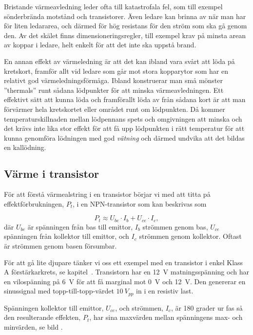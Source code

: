 Bristande värmeavledning leder ofta till katastrofala fel, som till exempel
sönderbrända motstånd och transistorer. Även ledare kan brinna av när man
har för liten ledararea, och därmed för hög resistans för den ström som
ska gå genom den. Av det skälet finns dimensioneringsregler, till exempel
krav på minsta arean av koppar i ledare, helt enkelt för att det inte ska
uppstå brand.

En annan effekt av värmeledning är att det kan ibland vara svårt att löda
på kretskort, framför allt vid ledare som går mot stora kopparytor som
har en relativt god värmeledningsförmåga. Ibland konstruerar man små mönster
''thermals'' runt sådana lödpunkter för att minska värmeavledningen.
Ett effektivt sätt att kunna löda och framförallt löda av från sådana
kort är att man förvärmer hela kretskortet eller området runt om
lödpunkten. Då kommer temperaturskillnaden mellan lödpennans spets och
omgivningen att minska och det krävs inte lika stor effekt för att få
upp lödpunkten i rätt temperatur för att kunna genomföra lödningen med god
\emph{vätning} och därmed undvika att det bildas en kallödning.

\subsection{Värme i transistor}


För att förstå värmealstring i en transistor börjar vi med att titta
på effektförbrukningen, \(P_t\), i en NPN-transistor som kan beskrivas
som

\[P_t \approx U_{be}\cdot I_b + U_{ce}\cdot I_c,\]
%
där \(U_{be}\) är spänningen från bas till emittor, \(I_b\)
strömmen genom bas,  \(U_{ce}\) spänningen från kollektor till
emittor, och \(I_c\) strömmen genom kollektor.
Oftast är strömmen genom basen försumbar.

För att gå lite djupare tänker vi oss ett exempel med en transistor i
enkel Klass A förstärkarkrets, se kapitel~.
Transistorn har en \qty{12}{\volt} matningsspänning och har en
vilospänning på \qty{6}{\volt} för att få marginal mot \qty{0}{\volt}
och \qty{+12}{\volt}.
Den genererar en sinussignal med topp-till-topp-värdet \(10\ V_{pp}\)
in i en resistiv last.

Spänningen kollektor till emittor, \(U_{ce}\), och strömmen, \(I_c\),
är 180 grader ur fas så den resulterande effekten, \(P_t\), har sina
maxvärden mellan spänningens max- och minvärden, se bild
.
